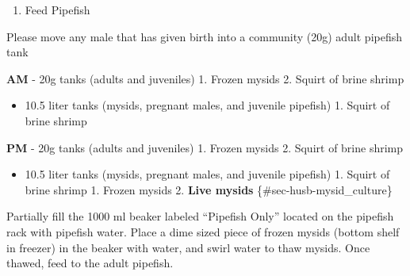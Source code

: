 \documentclass[
  letterpaper,
  DIV=11,
  numbers=noendperiod]{scrreprt}
\providecommand{\tightlist}{%
  \setlength{\itemsep}{0pt}\setlength{\parskip}{0pt}}\usepackage{longtable,booktabs,array}
\begin{document}
\begin{enumerate}
\def\labelenumi{\arabic{enumi}.}
\setcounter{enumi}{3}
\tightlist
\item
  Feed Pipefish
\end{enumerate}

\begin{tcolorbox}[enhanced jigsaw, bottomtitle=1mm, rightrule=.15mm, toptitle=1mm, opacitybacktitle=0.6, bottomrule=.15mm, titlerule=0mm, coltitle=black, leftrule=.75mm, arc=.35mm, colback=white, colframe=quarto-callout-warning-color-frame, left=2mm, colbacktitle=quarto-callout-warning-color!10!white, title=\textcolor{quarto-callout-warning-color}{\faExclamationTriangle}\hspace{0.5em}{NOTES}, toprule=.15mm, opacityback=0, breakable]

Please move any male that has given birth into a community (20g) adult
pipefish tank

\end{tcolorbox}

\textbf{AM} - 20g tanks (adults and juveniles) 1. Frozen mysids 2.
Squirt of brine shrimp

\begin{itemize}
\tightlist
\item
  10.5 liter tanks (mysids, pregnant males, and juvenile pipefish) 1.
  Squirt of brine shrimp
\end{itemize}

\textbf{PM} - 20g tanks (adults and juveniles) 1. Frozen mysids 2.
Squirt of brine shrimp

\begin{itemize}
\tightlist
\item
  10.5 liter tanks (mysids, pregnant males, and juvenile pipefish) 1.
  Squirt of brine shrimp 1. Frozen mysids 2. \textbf{Live mysids}
  \{\#sec-husb-mysid\_culture\}
\end{itemize}

\begin{tcolorbox}[enhanced jigsaw, bottomtitle=1mm, rightrule=.15mm, toptitle=1mm, opacitybacktitle=0.6, bottomrule=.15mm, titlerule=0mm, coltitle=black, leftrule=.75mm, arc=.35mm, colback=white, colframe=quarto-callout-warning-color-frame, left=2mm, colbacktitle=quarto-callout-warning-color!10!white, title=\textcolor{quarto-callout-warning-color}{\faExclamationTriangle}\hspace{0.5em}{NOTE FOR PREPARING AND FEEDING FROZEN MYSIDS}, toprule=.15mm, opacityback=0, breakable]

Partially fill the 1000 ml beaker labeled ``Pipefish Only'' located on
the pipefish rack with pipefish water. Place a dime sized piece of
frozen mysids (bottom shelf in freezer) in the beaker with water, and
swirl water to thaw mysids. Once thawed, feed to the adult pipefish.

\end{tcolorbox}
\end{document}
